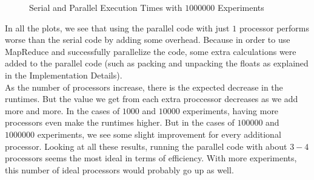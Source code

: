 \documentclass{article}
\begin{document}
\begin{center}
\begin{figure}[H]
\caption{Serial and Parallel Execution Times with $1000000$ Experiments}
\end{figure}
\end{center}

In all the plots, we see that using the parallel code with just $1$ processor performs worse than the serial code by adding some overhead. Because in order to use MapReduce and successfully parallelize the code, some extra calculations were added to the parallel code (such as packing and unpacking the floats as explained in the Implementation Details). \\

As the number of processors increase, there is the expected decrease in the runtimes. But the value we get from each extra proccessor decreases as we add more and more. In the cases of $1000$ and $10000$ experiments, having more processors even make the runtimes higher. But in the cases of $100000$ and $1000000$ experiments, we see some slight improvement for every additional processor. Looking at all these results, running the parallel code with about $3-4$ processors seems the most ideal in terms of efficiency. With more experiments, this number of ideal processors would probably go up as well.
\end{document}

